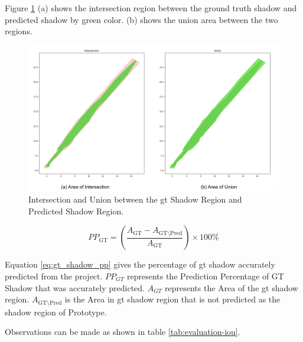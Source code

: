 Figure \ref{fig:evaluation-shadow_iou} (a) shows the intersection region between the ground truth shadow and predicted shadow by green color. (b) shows the union area between the two regions.

\begin{figure}[htbp]
    \centering
    \includegraphics[width=0.7\linewidth]{97_graphics//evaluation/shadow_iou.pdf}
    \caption{Intersection and Union between the \acrshort{gt} Shadow Region and Predicted Shadow Region.}
    \label{fig:evaluation-shadow_iou}
\end{figure}

\begin{equation}\label{eq:gt_shadow_pp}
    PP_{\text{GT}} = \left( \frac{A_{\text{GT}} - A_{\text{GT}\setminus\text{Pred}}}{A_{\text{GT}}} \right) \times 100\%
\end{equation}

Equation \ref{eq:gt_shadow_pp} gives the percentage of \acrshort{gt} shadow accurately predicted from the project. \(PP_{GT}\) represents the Prediction Percentage of GT Shadow that was accurately predicted. \(A_{GT}\) represents the Area of the \acrfull{gt} shadow region. \(A_{\text{GT}\setminus\text{Pred}}\) is the Area in \acrshort{gt} shadow region that is not predicted as the shadow region of Prototype.

Observations can be made as shown in table \ref{tab:evaluation-iou}.

